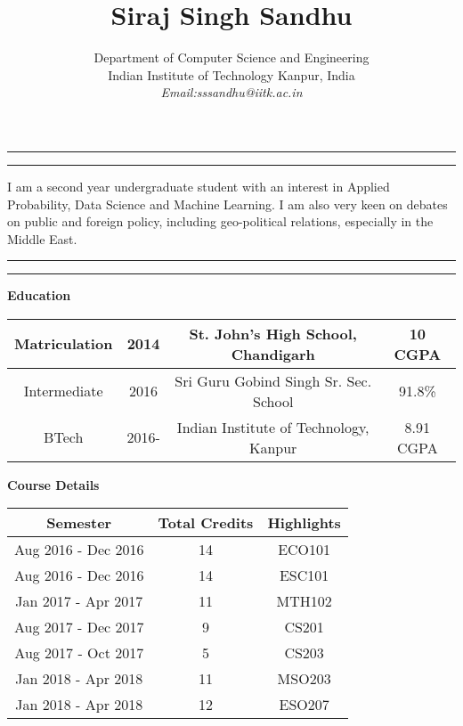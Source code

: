 \documentclass[a4paper, 11pt]{article}
\title{Siraj Singh Sandhu}
\author{%
Department of Computer Science and Engineering\\
Indian Institute of Technology Kanpur, India\\
{\it Email:sssandhu@iitk.ac.in}
}
\makeatletter
\renewcommand{\maketitle}{\bgroup\setlength{\parindent}{0pt}
\begin{flushleft}
  \textbf{\@title}

  \@author
\end{flushleft}\egroup
}
\makeatother
\begin{document}
\maketitle

\noindent\hrule %
\vspace{1mm}
\noindent\hrule

\noindent
I am a second year undergraduate student with an interest in Applied Probability, Data Science and Machine Learning. I am also very keen on debates on public and foreign policy, including geo-political relations, especially in the Middle East.

\noindent\hrule
\vspace{1mm}
\noindent\hrule
\vspace{5mm}

\noindent\textbf{Education}
\begin{flushleft} %
\begin{tabular}{ |c|c|c|c| }
\hline %
Matriculation & 2014 & St. John's High School, Chandigarh & 10 CGPA\\
\hline
Intermediate & 2016 & Sri Guru Gobind Singh Sr. Sec. School & 91.8\% \\
\hline
BTech & 2016- & Indian Institute of Technology, Kanpur & 8.91 CGPA \\ 
\hline
\end{tabular}
\end{flushleft}

\vspace{3mm}
\noindent\textbf{Course Details}
\begin{flushleft}
\begin{tabular}{ |c|c|c| }
\hline
\textbf{Semester} & \textbf{Total Credits} & \textbf{Highlights}\\
\hline
Aug 2016 - Dec 2016 & 14 & ECO101\\
Aug 2016 - Dec 2016 & 14 & ESC101\\
Jan 2017 - Apr 2017 & 11 & MTH102\\
Aug 2017 - Dec 2017 & 9 & CS201\\
Aug 2017 - Oct 2017 & 5 & CS203\\
Jan 2018 - Apr 2018 & 11 & MSO203\\
Jan 2018 - Apr 2018 & 12 & ESO207\\
\hline
\end{tabular}
\end{flushleft}
\vspace{3mm}
\end{document}
